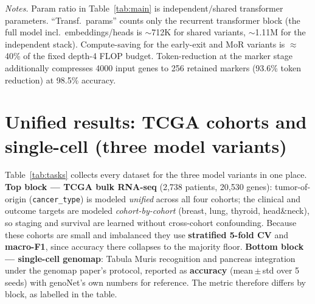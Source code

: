\documentclass[11pt]{article}
\begin{document}
\vspace{0.5em}
\noindent\footnotesize
\textit{Notes.} Param ratio in Table~\ref{tab:main} is independent$/$shared transformer
parameters. ``Transf.\ params'' counts only the recurrent transformer block (the full model
incl.\ embeddings/heads is $\sim$712K for shared variants, $\sim$1.11M for the independent
stack). Compute-saving for the early-exit and MoR variants is $\approx$40\% of the fixed
depth-4 FLOP budget. Token-reduction at the marker stage additionally compresses 4000 input
genes to 256 retained markers (93.6\% token reduction) at 98.5\% accuracy.

\clearpage
\section*{Unified results: TCGA cohorts and single-cell (three model variants)}
\normalsize
Table~\ref{tab:tasks} collects every dataset for the three model variants in one place.
\textbf{Top block --- TCGA bulk RNA-seq} (2{,}738 patients, 20{,}530 genes): tumor-of-origin
(\texttt{cancer\_type}) is modeled \emph{unified} across all four cohorts; the clinical and
outcome targets are modeled \emph{cohort-by-cohort} (breast, lung, thyroid, head\&neck), so
staging and survival are learned without cross-cohort confounding. Because these cohorts are
small and imbalanced they use \textbf{stratified 5-fold CV} and \textbf{macro-F1}, since
accuracy there collapses to the majority floor. \textbf{Bottom block --- single-cell genomap}:
Tabula Muris recognition and pancreas integration under the genomap paper's protocol, reported
as \textbf{accuracy} (mean\,$\pm$\,std over 5 seeds) with genoNet's own numbers for reference.
The metric therefore differs by block, as labelled in the table.
\end{document}
